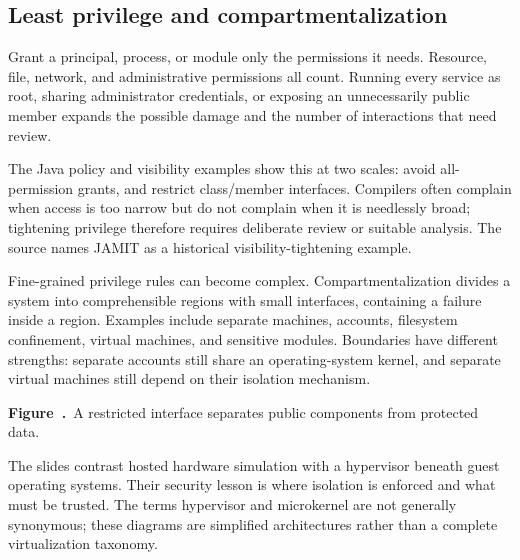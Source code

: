 \documentclass[11pt,a4paper]{article}
\numberwithin{figure}{section}
\newcommand{\diagramcaption}[1]{\par\smallskip\refstepcounter{figure}\begin{center}\small\textbf{Figure~\thefigure.}~#1\end{center}}
\begin{document}
\subsection{Least privilege and compartmentalization}
Grant a principal, process, or module only the permissions it needs. Resource, file, network, and administrative permissions all count. Running every service as root, sharing administrator credentials, or exposing an unnecessarily public member expands the possible damage and the number of interactions that need review.

The Java policy and visibility examples show this at two scales: avoid all-permission grants, and restrict class/member interfaces. Compilers often complain when access is too narrow but do not complain when it is needlessly broad; tightening privilege therefore requires deliberate review or suitable analysis. The source names JAMIT as a historical visibility-tightening example.

Fine-grained privilege rules can become complex. Compartmentalization divides a system into comprehensible regions with small interfaces, containing a failure inside a region. Examples include separate machines, accounts, filesystem confinement, virtual machines, and sensitive modules. Boundaries have different strengths: separate accounts still share an operating-system kernel, and separate virtual machines still depend on their isolation mechanism.

\begin{center}\end{center}
\diagramcaption{A restricted interface separates public components from protected data.}

The slides contrast hosted hardware simulation with a hypervisor beneath guest operating systems. Their security lesson is where isolation is enforced and what must be trusted. The terms hypervisor and microkernel are not generally synonymous; these diagrams are simplified architectures rather than a complete virtualization taxonomy.
\end{document}

